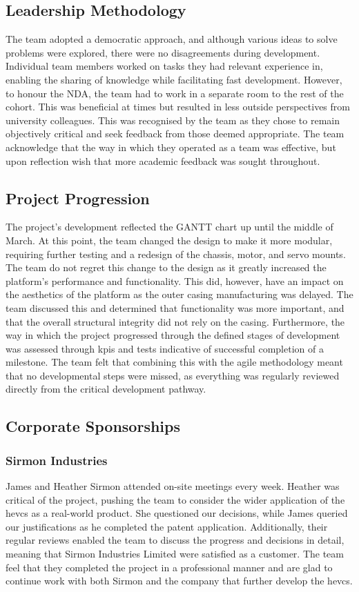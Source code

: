 \documentclass [12pt]{article}
\begin{document}
\subsection{Leadership Methodology}
The team adopted a democratic approach, and although various ideas to solve problems were explored, there were no disagreements during development. Individual team members worked on tasks they had relevant experience in, enabling the sharing of knowledge while facilitating fast development. However, to honour the NDA, the team had to work in a separate room to the rest of the cohort. This was beneficial at times but resulted in less outside perspectives from university colleagues. This was recognised by the team as they chose to remain objectively critical and seek feedback from those deemed appropriate. The team acknowledge that the way in which they operated as a team was effective, but upon reflection wish that more academic feedback was sought throughout.

\subsection{Project Progression}
The project’s development reflected the GANTT chart up until the middle of March. At this point, the team changed the design to make it more modular, requiring further testing and a redesign of the chassis, motor, and servo mounts. The team do not regret this change to the design as it greatly increased the platform’s performance and functionality. This did, however, have an impact on the aesthetics of the platform as the outer casing manufacturing was delayed.  The team discussed this and determined that functionality was more important, and that the overall structural integrity did not rely on the casing. Furthermore, the way in which the project progressed through the defined stages of development was assessed through \gls{kpi}s and tests indicative of successful completion of a milestone. The team felt that combining this with the agile methodology meant that no developmental steps were missed, as everything was regularly reviewed directly from the critical development pathway.

\subsection{Corporate Sponsorships}

\subsubsection{Sirmon Industries}
James and Heather Sirmon attended on-site meetings every week. Heather was critical of the project, pushing the team to consider the wider application of the \gls{hevcs} as a real-world product. She questioned our decisions, while James queried our justifications as he completed the patent application. Additionally, their regular reviews enabled the team to discuss the progress and decisions in detail, meaning that Sirmon Industries Limited were satisfied as a customer. The team feel that they completed the project in a professional manner and are glad to continue work with both Sirmon and the company that further develop the \gls{hevcs}.
\end{document}
